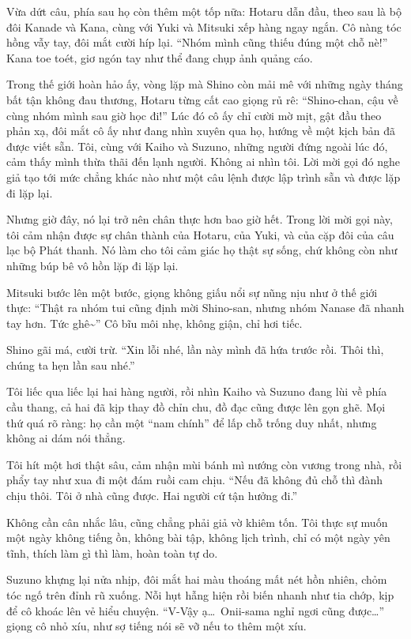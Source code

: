 \documentclass[../main.tex]{subfiles}
\begin{document}
Vừa dứt câu, phía sau họ còn thêm một tốp nữa: Hotaru dẫn đầu, theo sau là bộ đôi Kanade và Kana, cùng với Yuki và Mitsuki xếp hàng ngay ngắn. Cô nàng tóc hồng vẫy tay, đôi mắt cười híp lại. ``Nhóm mình cũng thiếu đúng một chỗ nè!'' Kana toe toét, giơ ngón tay như thể đang chụp ảnh quảng cáo.

Trong thế giới hoàn hảo ấy, vòng lặp mà Shino còn mải mê với những ngày tháng bất tận không đau thương, Hotaru từng cất cao giọng rủ rê: ``Shino-chan, cậu về cùng nhóm mình sau giờ học đi!'' Lúc đó cô ấy chỉ cười mờ mịt, gật đầu theo phản xạ, đôi mắt cô ấy như đang nhìn xuyên qua họ, hướng về một kịch bản đã được viết sẵn. Tôi, cùng với Kaiho và Suzuno, những người đứng ngoài lúc đó, cảm thấy mình thừa thãi đến lạnh người. Không ai nhìn tôi. Lời mời gọi đó nghe giả tạo tới mức chẳng khác nào như một câu lệnh được lập trình sẵn và được lặp đi lặp lại.

Nhưng giờ đây, nó lại trở nên chân thực hơn bao giờ hết. Trong lời mời gọi này, tôi cảm nhận được sự chân thành của Hotaru, của Yuki, và của cặp đôi của câu lạc bộ Phát thanh. Nó làm cho tôi cảm giác họ thật sự sống, chứ không còn như những búp bê vô hồn lặp đi lặp lại.

Mitsuki bước lên một bước, giọng không giấu nổi sự nũng nịu như ở thế giới thực: ``Thật ra nhóm tui cũng định mời Shino-san, nhưng nhóm Nanase đã nhanh tay hơn. Tức ghê\~{}'' Cô bĩu môi nhẹ, không giận, chỉ hơi tiếc.

Shino gãi má, cười trừ. ``Xin lỗi nhé, lần này mình đã hứa trước rồi. Thôi thì, chúng ta hẹn lần sau nhé.''

Tôi liếc qua liếc lại hai hàng người, rồi nhìn Kaiho và Suzuno đang lùi về phía cầu thang, cả hai đã kịp thay đồ chỉn chu, đồ đạc cũng được lên gọn ghẽ. Mọi thứ quá rõ ràng: họ cần một ``nam chính'' để lấp chỗ trống duy nhất, nhưng không ai dám nói thẳng.

Tôi hít một hơi thật sâu, cảm nhận mùi bánh mì nướng còn vương trong nhà, rồi phẩy tay như xua đi một đám ruồi cam chịu. ``Nếu đã không đủ chỗ thì đành chịu thôi. Tôi ở nhà cũng được. Hai người cứ tận hưởng đi.''

Không cần cân nhắc lâu, cũng chẳng phải giả vờ khiêm tốn. Tôi thực sự muốn một ngày không tiếng ồn, không bài tập, không lịch trình, chỉ có một ngày yên tĩnh, thích làm gì thì làm, hoàn toàn tự do.

Suzuno khựng lại nửa nhịp, đôi mắt hai màu thoáng mất nét hồn nhiên, chỏm tóc ngố trên đỉnh rũ xuống. Nỗi hụt hẫng hiện rồi biến nhanh như tia chớp, kịp để cô khoác lên vẻ hiểu chuyện. ``V-Vậy ạ\dots\ Onii-sama nghỉ ngơi cũng được\dots'' giọng cô nhỏ xíu, như sợ tiếng nói sẽ vỡ nếu to thêm một xíu.
\end{document}
